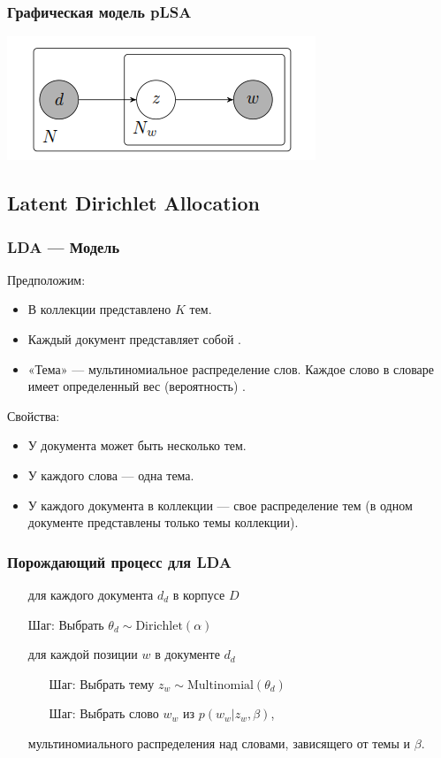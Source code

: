 \documentclass[10pt,svgnames]{beamer}
\newcommand{\dir}{\text{Dirichlet}}
\newcommand{\mult}{\text{Multinomial}}
\begin{document}
\begin{frame}
  \frametitle{Графическая модель pLSA}
  \centering
  \includegraphics[width=\textwidth]{plsa-model}
\end{frame}

\subsection{Latent Dirichlet Allocation}

\begin{frame}
  \frametitle{LDA — Модель}
  Предположим:
  \begin{itemize}
  \item В коллекции представлено $K$ тем.
  \item Каждый документ представляет собой .
  \item «Тема» — мультиномиальное распределение слов. Каждое слово в
    словаре имеет определенный вес (вероятность) .
  \end{itemize}

  Свойства:
  \begin{itemize}
  \item У документа может быть несколько тем.
  \item У каждого слова — одна тема.
  \item У каждого документа в коллекции — свое распределение тем (в
    одном документе представлены только  темы коллекции).
  \end{itemize}
\end{frame}

\begin{frame}
  \frametitle{Порождающий процесс для LDA}
  \begin{itemize}
  \item[для] каждого документа $d_d$ в корпусе $D$
  \item[Шаг:] Выбрать $\theta_d \sim \dir(\alpha) $
  \item[для] каждой позиции $w$ в документе $d_d$
    \begin{itemize}
    \item[Шаг:] Выбрать тему $z_w \sim \mult(\theta_d)$
    \item[Шаг:] Выбрать слово $w_w$ из $p(w_w | z_w,\beta)$,
    \end{itemize}
    мультиномиального распределения над словами, зависящего от темы и $\beta$.
\end{itemize}
\end{frame}
\end{document}
